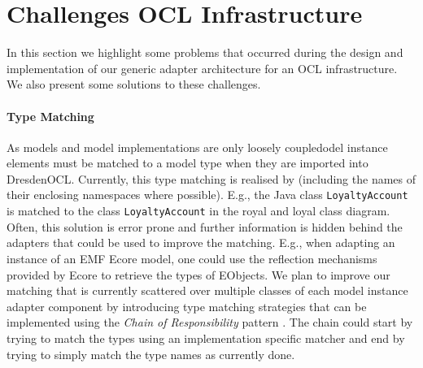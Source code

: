 \section{Challenges  OCL Infrastructure}

  In this section we highlight some problems that occurred during the design
  and implementation of our generic adapter architecture for an OCL infrastructure.
  We also present some solutions to these challenges.

	\paragraph{Type Matching}
	As models and model implementations are only loosely 
	coupledodel instance elements must be matched to a model type
	when they are imported into DresdenOCL. Currently, this type matching is realised by  (including the names of 
	their enclosing namespaces where possible). E.g., the Java class \texttt{LoyaltyAccount} is
	matched to the class \texttt{LoyaltyAccount} in the royal and loyal class diagram.
	Often, this solution is error prone  and further information is hidden behind the adapters that could be 
	used to improve the matching. E.g., when adapting an instance of an EMF 
	Ecore model, one could use the reflection mechanisms provided by Ecore to
	retrieve the types of EObjects. We plan to improve our matching
	that is currently scattered over multiple classes of each model instance 
	adapter component by introducing type matching strategies that 
	can be implemented using the \emph{Chain of Responsibility} 
	pattern \cite{gamma:dp}. The chain could start by trying to match the 
	types using an implementation specific matcher and end by trying to 
	simply match the type names as currently done.
	
